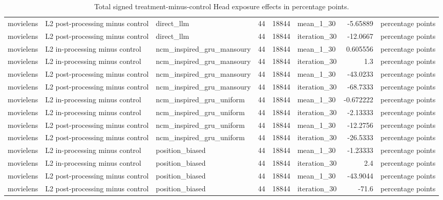 \begin{table}[htbp!]
\begin{tabular}{lllrrlrl}
movielens & L2 post-processing minus control & direct\_llm & 44 & 18844 & mean\_1\_30 & -5.65889 & percentage points \\
movielens & L2 post-processing minus control & direct\_llm & 44 & 18844 & iteration\_30 & -12.0667 & percentage points \\
movielens & L2 in-processing minus control & ncm\_inspired\_gru\_mansoury & 44 & 18844 & mean\_1\_30 & 0.605556 & percentage points \\
movielens & L2 in-processing minus control & ncm\_inspired\_gru\_mansoury & 44 & 18844 & iteration\_30 & 1.3 & percentage points \\
movielens & L2 post-processing minus control & ncm\_inspired\_gru\_mansoury & 44 & 18844 & mean\_1\_30 & -43.0233 & percentage points \\
movielens & L2 post-processing minus control & ncm\_inspired\_gru\_mansoury & 44 & 18844 & iteration\_30 & -68.7333 & percentage points \\
movielens & L2 in-processing minus control & ncm\_inspired\_gru\_uniform & 44 & 18844 & mean\_1\_30 & -0.672222 & percentage points \\
movielens & L2 in-processing minus control & ncm\_inspired\_gru\_uniform & 44 & 18844 & iteration\_30 & -2.13333 & percentage points \\
movielens & L2 post-processing minus control & ncm\_inspired\_gru\_uniform & 44 & 18844 & mean\_1\_30 & -12.2756 & percentage points \\
movielens & L2 post-processing minus control & ncm\_inspired\_gru\_uniform & 44 & 18844 & iteration\_30 & -26.5333 & percentage points \\
movielens & L2 in-processing minus control & position\_biased & 44 & 18844 & mean\_1\_30 & -1.23333 & percentage points \\
movielens & L2 in-processing minus control & position\_biased & 44 & 18844 & iteration\_30 & 2.4 & percentage points \\
movielens & L2 post-processing minus control & position\_biased & 44 & 18844 & mean\_1\_30 & -43.9044 & percentage points \\
movielens & L2 post-processing minus control & position\_biased & 44 & 18844 & iteration\_30 & -71.6 & percentage points \\
\hline
\end{tabular}
\caption{Total signed treatment-minus-control Head exposure effects in percentage points.}
\label{chap:results:tab:rq4_head_exposure_effects}
\end{table}
